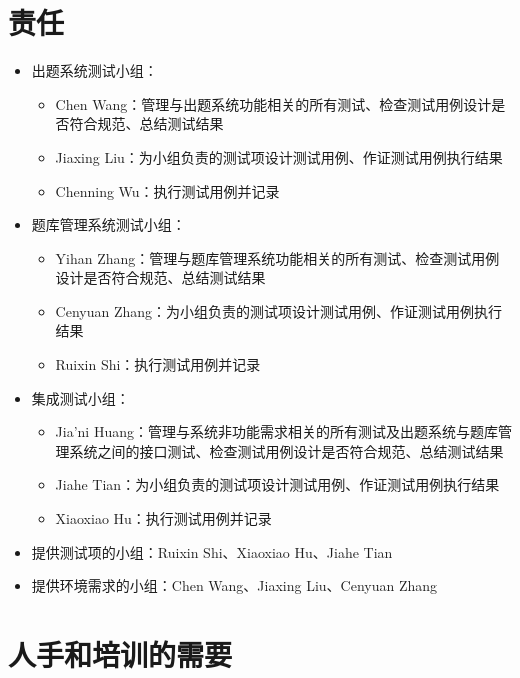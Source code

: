 \documentclass[hyperref, a4paper]{ctexart}
\providecommand{\tightlist}{%
  \setlength{\itemsep}{0pt}\setlength{\parskip}{0pt}}
\begin{document}
\hypertarget{ux8d23ux4efb}{%
\section{责任}\label{ux8d23ux4efb}}

\begin{itemize}
\tightlist
\item
  出题系统测试小组：

  \begin{itemize}
  \tightlist
  \item
    Chen
    Wang：管理与出题系统功能相关的所有测试、检查测试用例设计是否符合规范、总结测试结果
  \item
    Jiaxing Liu：为小组负责的测试项设计测试用例、作证测试用例执行结果
  \item
    Chenning Wu：执行测试用例并记录
  \end{itemize}
\item
  题库管理系统测试小组：

  \begin{itemize}
  \tightlist
  \item
    Yihan
    Zhang：管理与题库管理系统功能相关的所有测试、检查测试用例设计是否符合规范、总结测试结果
  \item
    Cenyuan Zhang：为小组负责的测试项设计测试用例、作证测试用例执行结果
  \item
    Ruixin Shi：执行测试用例并记录
  \end{itemize}
\item
  集成测试小组：

  \begin{itemize}
  \tightlist
  \item
    Jia'ni
    Huang：管理与系统非功能需求相关的所有测试及出题系统与题库管理系统之间的接口测试、检查测试用例设计是否符合规范、总结测试结果
  \item
    Jiahe Tian：为小组负责的测试项设计测试用例、作证测试用例执行结果
  \item
    Xiaoxiao Hu：执行测试用例并记录
  \end{itemize}
\item
  提供测试项的小组：Ruixin Shi、Xiaoxiao Hu、Jiahe Tian
\item
  提供环境需求的小组：Chen Wang、Jiaxing Liu、Cenyuan Zhang
\end{itemize}

\hypertarget{ux4ebaux624bux548cux57f9ux8badux7684ux9700ux8981}{%
\section{人手和培训的需要}\label{ux4ebaux624bux548cux57f9ux8badux7684ux9700ux8981}}
\end{document}
